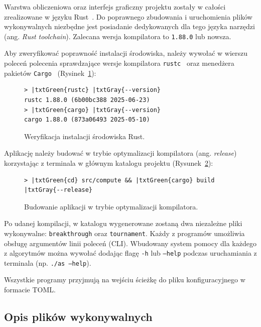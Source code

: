 \documentclass{article}
\begin{document}
Warstwa obliczeniowa oraz interfejs graficzny projektu zostały w całości zrealizowane w języku Rust~\cite{rust-install}. Do poprawnego zbudowania i uruchomienia plików wykonywalnych niezbędne jest posiadanie dedykowanych dla tego języka narzędzi (ang. \textit{Rust toolchain}). Zalecana wersja kompilatora to \texttt{1.88.0} lub nowsza.

Aby zweryfikować poprawność instalacji środowiska, należy wywołać w wierszu poleceń polecenia sprawdzające wersje kompilatora \texttt{rustc}~\cite{rustc-man} oraz menedżera pakietów \texttt{Cargo}~\cite{cargo-book} (Rysinek~\ref{fig:rust-check}):

\begin{figure}[H]
\small
\centering
\begin{Verbatim}[commandchars=\|\{\}]
> |txtGreen{rustc} |txtGray{--version}
rustc 1.88.0 (6b00bc388 2025-06-23)
> |txtGreen{cargo} |txtGray{--version}
cargo 1.88.0 (873a06493 2025-05-10)
\end{Verbatim}
\caption{Weryfikacja instalacji środowiska Rust.}
\label{fig:rust-check}
\end{figure}

\noindent
Aplikację należy budować w trybie optymalizacji kompilatora (ang. \textit{release}) korzystając z terminala w głównym katalogu projektu (Rysunek~\ref{fig:cargo-build}):

\begin{figure}[H]
\small
\centering
\begin{Verbatim}[commandchars=\|\{\}]
> |txtGreen{cd} src/compute && |txtGreen{cargo} build |txtGray{--release}
\end{Verbatim}
\caption{Budowanie aplikacji w trybie optymalizacji kompilatora.}
\label{fig:cargo-build}
\end{figure}

Po udanej kompilacji, w katalogu  wygenerowane zostaną dwa niezależne pliki wykonywalne: \texttt{breakthrough} oraz \texttt{tournament}. Każdy z programów umożliwia obsługę argumentów linii poleceń (CLI). Wbudowany system pomocy dla każdego z algorytmów można wywołać dodając flagę \texttt{-h} lub \texttt{---help} podczas uruchamiania z terminala (np. \texttt{./as ---help}).

Wszystkie programy przyjmują na wejściu ścieżkę do pliku konfiguracyjnego w formacie TOML.

\subsection{Opis plików wykonywalnych}
\end{document}
